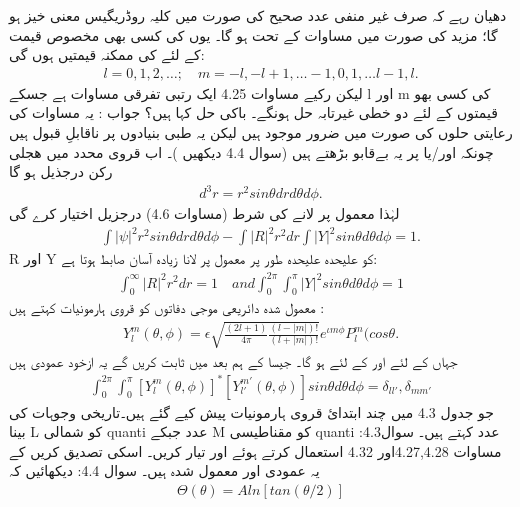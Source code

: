 دھیان رہے کہ صرف غیر منفی عدد صحیح  کی صورت میں کلیہ روڈریگیس معنی خیز ہو گا؛ مزید  کی صورت میں مساوات  کے تحت  ہو گا۔ یوں  کی کسی بھی مخصوص قیمت کے لئے  کی  ممکنہ قیمتیں ہوں گی:
\begin{align}
l=0,1,2,\dotsc;\quad{m=-l,-l+1,\dotsc-1,0,1,\dotsc l-1,l.} 
\end{align}
لیکن رکیے مساوات 
4.25
ایک رتبی تفرقی مساوات ہے جسکے l اور m کی کسی بھو قیمتوں کے لئے دو خطی غیرتابہ حل ہونگے۔ باکی حل کہا ہیں؟
جواب :
یہ مساوات کی رعایتی حلوں کی  صورت میں ضرور موجود ہیں لیکن یہ طبی بنیادوں پر ناقابلِ قبول ہیں چونکہ
اور/یا
پر یہ بےقابو بڑھتے ہیں (سوال 4.4 دیکھیں )۔
اب قروی محدد میں ھجلی رکن درجذیل ہو گا
\begin{align}
d^{3}r=r^{2}sin\theta{dr}d\theta{d\phi}. 
\end{align}
لہٰذا معمول پر لانے کی شرط (مساوات 
4.6)
درجزیل اختیار کرے گی
\begin{align}
\int|\psi|^{2}r^{2}sin\theta{drd\theta}d\phi-\int|R|^{2}r^{2}dr\int|Y|^{2}sin\theta{d\theta}d\phi=1. 
\end{align}
R اور Y کو علیحدہ علیحدہ طور پر معمول پر لانا زیادہ آسان صابط ہوتا ہے:
\begin{align}
\int_{0}^{\infty}|R|^{2}r^{2}dr=1\quad{and}\int_{0}^{2\pi}\int_{0}^{\pi}|Y|^{2}sin\theta{d\theta}d\phi=1 
\end{align}
معمول شدہ  دائریعی موجی دفاتوں کو قروی ہارمونیات کہتے ہیں :
\begin{align}
\boxed{Y_{l}^{m}(\theta,\phi)=\epsilon\sqrt{\frac{(2l+1)}{4\pi}\frac{(l-|m|)!}{(l+|m|)!}}e^{\iota{m\phi}}P_{l}^{m}(cos\theta.} 
\end{align}
جہاں
کے لئے
اور
کے لئے
ہو گا۔ جیسا کے ہم بعد میں ثابت کریں گے یہ ازخود عمودی ہیں
\begin{align}
\int_{0}^{2\pi}\int_{0}^{\pi}[Y_{l}^{m}(\theta,\phi)]^{*}[Y_{l'}^{m'}(\theta,\phi)]sin\theta{d\theta}d\phi=\delta_{ll'},\delta_{mm'} 
\end{align}
جو جدول
4.3
میں چند ابتدائ قروی ہارمونیات پیش کیے گئے ہیں۔تاریخی وجوہات کی بینا L کو شمالی quanti عدد جبکے M کو مقناطیسی quanti عدد کہتے ہیں۔
سوال4.3:
مساوات 4.27,4.28اور 4.32 استعمال کرتے ہوئے 
اور
تیار کریں۔ اسکی تصدیق کریں کے یہ عمودی اور معمول شدہ ہیں۔
سوال 4.4:
دیکھائیں کہ
\begin{align}
\Theta(\theta)=Aln[tan(\theta/2)] 
\end{align}
